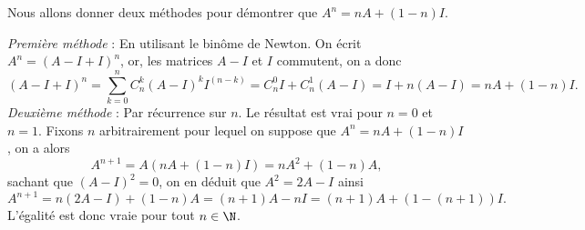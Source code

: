 {\begin{enumerate}
{Nous allons donner deux méthodes pour démontrer que $A^n=nA+(1-n)I$.

{\it Première méthode} :  En utilisant le bin\^ome de Newton. On écrit $A^n=(A-I+I)^n$, or, les matrices $A-I$ et $I$ commutent, on a donc
$$(A-I+I)^n=\sum_{k=0}^nC_n^k(A-I)^kI^{(n-k)}=C_n^0I+C_n^1(A-I)=I+n(A-I)=nA+(1-n)I.$$
{\it Deuxième méthode} : Par récurrence sur $n$. Le résultat est vrai pour $n=0$ et $n=1$. Fixons $n$ arbitrairement pour lequel on suppose que $A^n=nA+(1-n)I$, on a alors
$$A^{n+1}=A(nA+(1-n)I)=nA^2+(1-n)A,$$
sachant que $(A-I)^2=0$, on en déduit que $A^2=2A-I$ ainsi
$$A^{n+1}=n(2A-I)+(1-n)A=(n+1)A-nI=(n+1)A+(1-(n+1))I.$$
L'égalité est donc vraie pour tout $n\in\N$.}
\end{enumerate}
}
